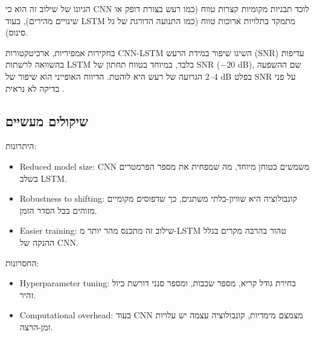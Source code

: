 הגיונו של שילוב זה הוא כי \textenglish{CNN} לוכד תבניות מקומיות קצרות טווח (כמו רעש בצורת דופק או שינויים מהירים), בעוד \textenglish{LSTM} מתמקד בתלויות ארוכות טווח (כמו התנועה הדורגת של גל סינוס).

בחקירות אמפיריות, ארכיטקטורות \textenglish{CNN-LSTM} השיגו שיפור במידת הרעש (\textenglish{SNR}) עדיפות בהשוואה לרשתות \textenglish{LSTM} בלבד, במיוחד בטווח תחתון של \textenglish{SNR} ($-20$ \textenglish{dB}), שם ההשפעה הגרועה של רעש היא לוהטת. הדיווח האופייני הוא שיפור של $2$--$4$ \textenglish{dB} בפלט \textenglish{SNR} על פני בדיקה לא נראית \cite{park2024hybrid}.

\subsection{שיקולים מעשיים}

היתרונות:

\begin{itemize}
\item \textenglish{Reduced model size}: \textenglish{CNN} משמשים כטוחן מיוחד, מה שמפחית את מספר הפרמטרים בשלב \textenglish{LSTM}.
\item \textenglish{Robustness to shifting}: קונבולוציה היא שוויון-בלתי משתנים, כך שדפוסים מקומיים מזוהים בכל הסדר הזמן.
\item \textenglish{Easier training}: שילוב זה מתכנס מהר יותר מ-\textenglish{LSTM} טהור בהרבה מקרים בגלל ההנקה של \textenglish{CNN}.
\end{itemize}

החסרונות:

\begin{itemize}
\item \textenglish{Hyperparameter tuning}: בחירת גודל קריא, מספר שכבות, ומספר סנני דורשת כיול זהיר.
\item \textenglish{Computational overhead}: בעוד \textenglish{CNN} מצמצם מימדיות, קונבולוציה עצמה יש עלויות זמן-הרצה.
\end{itemize}
